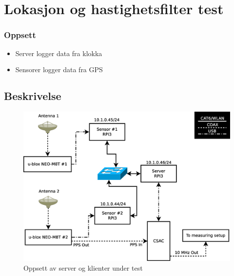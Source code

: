 \documentclass[xcolor=table]{beamer}
\begin{document}
\section{Lokasjon og hastighetsfilter test}
\begin{frame}
\frametitle{Oppsett}
  \begin{itemize}
    \item Server logger data fra klokka
    \item Sensorer logger data fra GPS
  \end{itemize}
  \subsection{Beskrivelse}
      \begin{figure}
        \includegraphics[scale=0.25]{thesis/graphics/server_layout.eps}
        \caption{Oppsett av server og klienter under test}
      \end{figure}
\end{frame}
\end{document}
